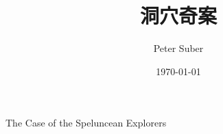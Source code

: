 \documentclass[UTF8]{ctexart}
\title{洞穴奇案}
\author{Peter Suber}
\date{\today}
\begin{document}
  
\maketitle  
The Case of the Speluncean Explorers
\end{document}
